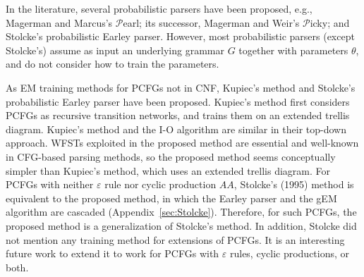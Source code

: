 \documentclass[english]{jnlp_1.4_rep}
\newcommand{\derivesplus}{}
\begin{document}
In the literature, several probabilistic parsers have been
proposed, e.g., Magerman and 
\linebreak
Marcus's \citeyear{Magerman91}
$\mathcal{P}$earl; its successor, Magerman and Weir's \citeyear{Magerman92}
$\mathcal{P}$icky; and Stolcke's \citeyear{Stolcke95}
probabilistic Earley parser.
However, most probabilistic parsers (except Stolcke's)
assume as input an underlying grammar $G$ together with
parameters $\theta$, and do not consider how to train
the parameters.

As EM training methods for PCFGs not in CNF,
Kupiec's \citeyear{Kupiec92} method and
Stolcke's probabilistic Earley parser have been proposed.
Kupiec's method first considers PCFGs as recursive transition networks,
and trains them on an extended trellis diagram.  Kupiec's method
and the I-O algorithm are similar in their top-down approach.
WFSTs exploited in the proposed method are essential and
well-known in CFG-based parsing methods, so the proposed method
seems conceptually simpler than Kupiec's method, which uses
an extended trellis diagram.
For PCFGs with neither $\varepsilon$ rule nor cyclic production
$A\derivesplus A$, Stolcke's (1995) method is equivalent to the proposed
method, in which the Earley parser and the gEM algorithm are
cascaded (Appendix~\ref{sec:Stolcke}).
Therefore, for such PCFGs, the proposed method is a generalization
of Stolcke's method.  In addition, Stolcke did not mention any
training method for extensions of PCFGs.
It is an interesting future work
to extend it to work for PCFGs with $\varepsilon$ rules,
cyclic productions, or both.
\end{document}
